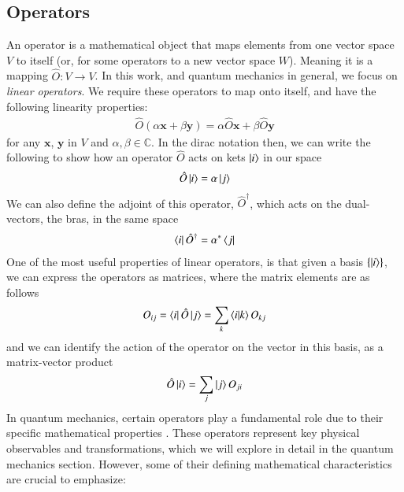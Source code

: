 \documentclass{subfiles}
\begin{document}
\subsection{Operators}
An operator is a mathematical object that maps elements from one vector space $V$ to itself (or, for some operators to a new vector space $W$)\cite{berera2021quantum}. Meaning it is a mapping $\hat O: V \rightarrow V$. In this work, and quantum mechanics in general, we focus on \emph{linear operators}. We require these operators to map onto itself, and have the following linearity properties:
\begin{align*}
    \hat O(\alpha \mathbf{x} + \beta\mathbf{y}) = \alpha \hat O\mathbf{x} + \beta \hat O\mathbf{y}
\end{align*}
for any $\mathbf{x}$, $\mathbf{y}$ in $V$ and $\alpha, \beta\in \mathbb{C}$. In the dirac notation then, we can write the following to show how an operator $\hat O$ acts on kets $\ket{i}$ in our space
\begin{align*}
    \hat O\ket{i} = \alpha \ket{j}
\end{align*}
We can also define the adjoint of this operator, $\hat O^\dagger$, which acts on the dual-vectors, the bras, in the same space
\begin{align*}
    \bra{i}\hat O^\dagger = \alpha^* \bra{j}
\end{align*}
One of the most useful properties of linear operators, is that given a basis $\{\ket{i}\}$, we can express the operators as matrices, where the matrix elements are as follows
\begin{align*}
    O_{ij} = \bra{i}\hat O\ket{j} = \sum_k\braket{i|k}O_{kj}
\end{align*}
and we can identify the action of the operator on the vector in this basis, as a matrix-vector product
\begin{align*}
    \hat O\ket{i} = \sum_j \ket{j}O_{ji}
\end{align*}
In quantum mechanics, certain operators play a fundamental role due to their specific mathematical properties \cite{griffiths2018introduction, berera2021quantum}. These operators represent key physical observables and transformations, which we will explore in detail in the quantum mechanics section. However, some of their defining mathematical characteristics are crucial to emphasize:
\end{document}
